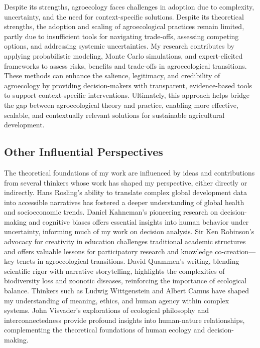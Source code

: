 \documentclass[
]{article}
\begin{document}
Despite its strengths, agroecology faces challenges in adoption due to
complexity, uncertainty, and the need for context-specific solutions.
Despite its theoretical strengths, the adoption and scaling of
agroecological practices remain limited, partly due to insufficient
tools for navigating trade-offs, assessing competing options, and
addressing systemic uncertainties. My research contributes by applying
probabilistic modeling, Monte Carlo simulations, and expert-elicited
frameworks to assess risks, benefits and trade-offs in agroecological
transitions. These methods can enhance the salience, legitimacy, and
credibility of agroecology by providing decision-makers with
transparent, evidence-based tools to support context-specific
interventions. Ultimately, this approach helps bridge the gap between
agroecological theory and practice, enabling more effective, scalable,
and contextually relevant solutions for sustainable agricultural
development.

\hypertarget{other-influential-perspectives}{%
\subsection*{Other Influential
Perspectives}\label{other-influential-perspectives}}

The theoretical foundations of my work are influenced by ideas and
contributions from several thinkers whose work has shaped my
perspective, either directly or indirectly. Hans Rosling's ability to
translate complex global development data into accessible narratives has
fostered a deeper understanding of global health and socioeconomic
trends. Daniel Kahneman's pioneering research on decision-making and
cognitive biases offers essential insights into human behavior under
uncertainty, informing much of my work on decision analysis. Sir Ken
Robinson's advocacy for creativity in education challenges traditional
academic structures and offers valuable lessons for participatory
research and knowledge co-creation---key tenets in agroecological
transitions. David Quammen's writing, blending scientific rigor with
narrative storytelling, highlights the complexities of biodiversity loss
and zoonotic diseases, reinforcing the importance of ecological balance.
Thinkers such as Ludwig Wittgenstein and Albert Camus have shaped my
understanding of meaning, ethics, and human agency within complex
systems. John Visvader's explorations of ecological philosophy and
interconnectedness provide profound insights into human-nature
relationships, complementing the theoretical foundations of human
ecology and decision-making.
\end{document}
